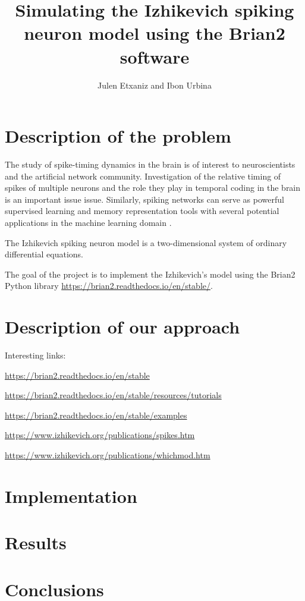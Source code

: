 \documentclass{article} %
\title{Simulating the Izhikevich spiking neuron model using
the Brian2 software}
\author{Julen Etxaniz and Ibon Urbina}
\begin{document}
\maketitle

\begin{abstract}

\end{abstract}

\tableofcontents
\newpage

\section{Description of the problem}


The study of spike-timing dynamics in the brain is of interest to neuroscientists and the artificial
network community. Investigation of the relative timing of spikes of multiple neurons \cite{Izhikevich2008LargescaleMO} and the
role they play in temporal coding in the brain is an important issue issue. Similarly, spiking networks
can serve as powerful supervised learning and memory representation tools with several potential
applications in the machine learning domain \cite{PaugamMoisy2008DelayLA}.

The Izhikevich spiking neuron model \cite{Izhikevich2003Simple} \cite{Izhikevich2004Which} is a two-dimensional system of ordinary differential
equations.

The goal of the project is to implement the Izhikevich’s model using the Brian2 Python library \url{https://brian2.readthedocs.io/en/stable/}.


\section{Description of our approach}

Interesting links:

\url{https://brian2.readthedocs.io/en/stable}

\url{https://brian2.readthedocs.io/en/stable/resources/tutorials}

\url{https://brian2.readthedocs.io/en/stable/examples}

\url{https://www.izhikevich.org/publications/spikes.htm}

\url{https://www.izhikevich.org/publications/whichmod.htm}
 
\section{Implementation}

\section{Results}

\section{Conclusions}



\end{document}
